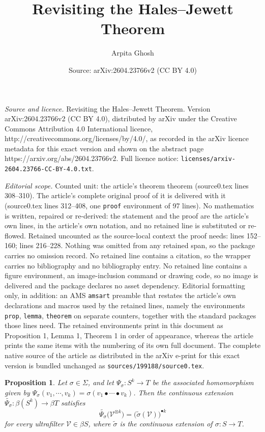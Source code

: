 \documentclass[10pt,a4paper]{amsart}
\title{Revisiting the Hales--Jewett Theorem}
\author{Arpita Ghosh}
\date{Source: arXiv:2604.23766v2 (CC BY 4.0)}
\newtheorem{prop}{Proposition}
\begin{document}
\maketitle

\noindent\emph{Source and licence.} Revisiting the Hales--Jewett Theorem. Version arXiv:2604.23766v2 (CC BY 4.0), distributed by arXiv under the Creative Commons Attribution 4.0 International licence, http://creativecommons.org/licenses/by/4.0/, as recorded in the arXiv licence metadata for this exact version and shown on the abstract page https://arxiv.org/abs/2604.23766v2. Full licence notice: \texttt{licenses/arxiv-2604.23766-CC-BY-4.0.txt}.\par\smallskip

\noindent\textit{Editorial scope.} Counted unit: the article's theorem theorem (source0.tex lines 308--310). The article's complete original proof of it is delivered with it (source0.tex lines 312--408, one \texttt{proof} environment of 97 lines). No mathematics is written, repaired or re-derived: the statement and the proof are the article's own lines, in the article's own notation, and no retained line is substituted or re-flowed.  Retained uncounted as the source-local context the proof needs: lines 152--160; lines 216--228.  Nothing was omitted from any retained span, so the package carries no omission record.  No retained line contains a citation, so the wrapper carries no bibliography and no bibliography entry.  No retained line contains a figure environment, an image-inclusion command or drawing code, so no image is delivered and the package declares no asset dependency.  Editorial formatting only, in addition: an AMS \texttt{amsart} preamble that restates the article's own declarations and macros used by the retained lines, namely the environments \texttt{prop}, \texttt{lemma}, \texttt{theorem} on separate counters, together with the standard packages those lines need.  The retained environments print in this document as Proposition 1, Lemma 1, Theorem 1 in order of appearance, whereas the article prints the same items with the numbering of its own full document.  The complete native source of the article as distributed in the arXiv e-print for this exact version is bundled unchanged as \texttt{sources/199188/source0.tex}.
\begin{prop}\label{pindultra}
Let $\sigma\in \Sigma$, and let $\Psi_\sigma:S^k\to T$ be the associated homomorphism given by $\Psi_\sigma(v_1, \cdots , v_k)= \sigma(v_1\bullet \cdots \bullet v_k)$. Then the continuous extension $\widetilde{\Psi_\sigma}:\beta(S^k)\to \beta T$
satisfies
\[
\widetilde{\Psi_\sigma}\bigl(\mathcal{V}^{\otimes k}\bigr)
   =\bigl(\widetilde{\sigma}(\mathcal{V})\bigr)^{\bullet k}
\]
for every ultrafilter $\mathcal{V}\in \beta S$, where $\widetilde{\sigma}$ is the continuous extension of $\sigma: S \rightarrow T$.
\end{prop}
\end{document}
